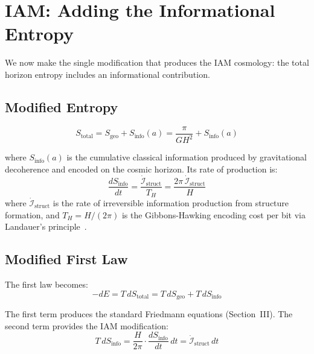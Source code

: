 \documentclass[aps,prd,twocolumn,superscriptaddress,nofootinbib]{revtex4-2}
\begin{document}
\section{IAM: Adding the Informational Entropy}
\label{sec:iam}

We now make the single modification that produces the IAM cosmology: the total horizon entropy includes an informational contribution.

\subsection{Modified Entropy}

\begin{equation}
S_\text{total} = S_\text{geo} + S_\text{info}(a) = \frac{\pi}{GH^2} + S_\text{info}(a)
\label{eq:Stotal}
\end{equation}

where $S_\text{info}(a)$ is the cumulative classical information produced by gravitational decoherence and encoded on the cosmic horizon. Its rate of production is:
\begin{equation}
\frac{dS_\text{info}}{dt} = \frac{\dot{\mathcal{I}}_\text{struct}}{T_H} = \frac{2\pi\,\dot{\mathcal{I}}_\text{struct}}{H}
\label{eq:dSinfo_dt}
\end{equation}
where $\dot{\mathcal{I}}_\text{struct}$ is the rate of irreversible information production from structure formation, and $T_H = H/(2\pi)$ is the Gibbons-Hawking encoding cost per bit via Landauer's principle~\cite{Landauer1961}.

\subsection{Modified First Law}

The first law becomes:
\begin{equation}
-dE = T\,dS_\text{total} = T\,dS_\text{geo} + T\,dS_\text{info}
\label{eq:modified_first_law}
\end{equation}

The first term produces the standard Friedmann equations (Section~III). The second term provides the IAM modification:
\begin{equation}
T\,dS_\text{info} = \frac{H}{2\pi}\cdot\frac{dS_\text{info}}{dt}\,dt = \dot{\mathcal{I}}_\text{struct}\,dt
\end{equation}
\end{document}
